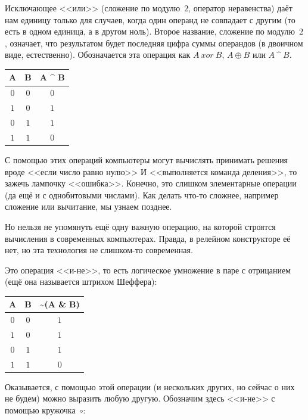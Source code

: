 Исключающее <<или>> (сложение по модулю~$2$, оператор неравенства) даёт нам единицу только для случаев,
когда один операнд не совпадает с другим (то есть в одном единица, а в другом ноль).
Второе название, сложение по модулю~$2$, означает, что результатом будет последняя цифра суммы операндов
(в двоичном виде, естественно).
Обозначается эта операция как $A\ xor\ B$, $A \oplus B$ или $A\ \mbox{\textasciicircum}\ B$.

\begin{center}
\begin{tabular}{|c|c|c|}
 \hline
 \textbf{A} & \textbf{B} & \textbf{A \textasciicircum{} B} \\ \hline
 $0$ & $0$ & $0$ \\ \hline
 $1$ & $0$ & $1$ \\ \hline
 $0$ & $1$ & $1$ \\ \hline
 $1$ & $1$ & $0$ \\ \hline
\end{tabular}
\end{center}

С помощью этих операций компьютеры могут вычислять принимать решения вроде <<если число равно нулю>> И <<выполняется команда деления>>,
то зажечь лампочку <<ошибка>>.
Конечно, это слишком элементарные операции (да ещё и с однобитовыми числами).
Как делать что-то сложнее, например сложение или вычитание, мы узнаем позднее.

Но нельзя не упомянуть ещё одну важную операцию, на которой строятся вычисления в современных
компьютерах. Правда, в релейном конструкторе её нет, но эта технология не слишком-то современная.

Это операция <<и-не>>, то есть логическое умножение в паре с отрицанием (ещё она называется штрихом Шеффера):

\begin{center}
\begin{tabular}{|c|c|c|}
 \hline
 \textbf{A} & \textbf{B} & \textbf{\textasciitilde(A \& B)} \\ \hline
 $0$ & $0$ & $1$ \\ \hline
 $1$ & $0$ & $1$ \\ \hline
 $0$ & $1$ & $1$ \\ \hline
 $1$ & $1$ & $0$ \\ \hline
\end{tabular}
\end{center}

Оказывается, с помощью этой операции (и нескольких других, но сейчас о них не будем) можно выразить любую другую.
Обозначим здесь <<и-не>> с помощью кружочка~$\circ$:

